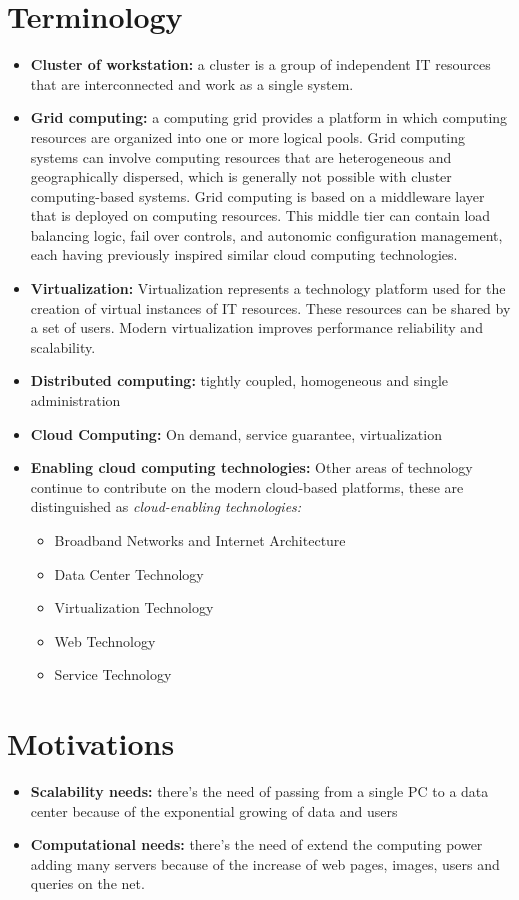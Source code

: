 \section{Terminology}
\begin{itemize}
    \item \textbf{Cluster of workstation:} a cluster is a group of independent IT resources that are interconnected and work as a single system.
    \item \textbf{Grid computing:} a computing grid provides a platform in which computing resources are organized into one or more logical pools. Grid computing systems can involve computing resources that are heterogeneous and geographically dispersed, which is generally not possible with cluster computing-based systems. Grid computing is based on a middleware layer that is deployed on computing resources. This middle tier can contain load balancing logic, fail over controls, and autonomic configuration management, each having previously inspired similar cloud computing technologies.
    \item \textbf{Virtualization:} Virtualization represents a technology platform used for the creation of virtual instances of IT resources. These resources can be shared by a set of users. Modern virtualization improves performance reliability and scalability.
    \item \textbf{Distributed computing:} tightly coupled, homogeneous and single administration
    \item \textbf{Cloud Computing:} On demand, service guarantee, virtualization
    \item \textbf{Enabling cloud computing technologies:} Other areas of technology continue to contribute on the modern cloud-based platforms, these are distinguished as \textit{cloud-enabling technologies:}
    \begin{itemize}
        \item Broadband Networks and Internet Architecture
        \item Data Center Technology
        \item Virtualization Technology
        \item Web Technology
        \item Service Technology
    \end{itemize}
\end{itemize}

\section{Motivations}
\begin{itemize}
    \item \textbf{Scalability needs:} there’s the need of passing from a single PC to a data center because of the exponential growing of data and users
    \item \textbf{Computational needs:}  there’s the need of extend the computing power adding many servers because of the increase of web pages, images, users and queries on the net.
\end{itemize}

